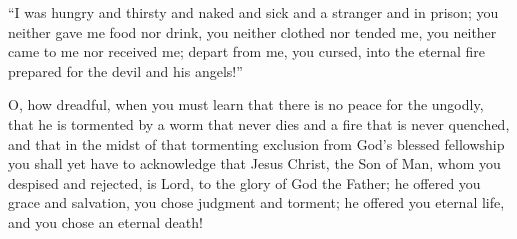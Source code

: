 “I was hungry and thirsty and naked and sick and a stranger and in prison; you neither gave me food nor drink, you neither clothed nor tended me, you neither came to me nor received me; depart from me, you cursed, into the eternal fire prepared for the devil and his angels!”

O, how dreadful, when you must learn that there is no peace for the ungodly, that he is tormented by a worm that never dies and a fire that is never quenched, and that in the midst of that tormenting exclusion from God’s blessed fellowship you shall yet have to acknowledge that Jesus Christ, the Son of Man, whom you despised and rejected, is Lord, to the glory of God the Father; he offered you grace and salvation, you chose judgment and torment; he offered you eternal life, and you chose an eternal death!
